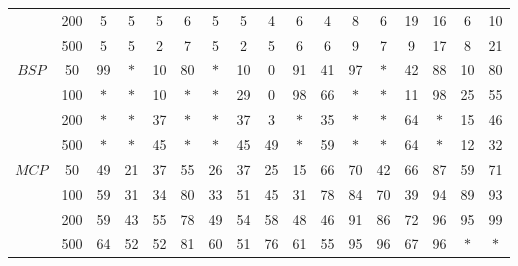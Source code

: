 \documentclass[12pt]{article}
\begin{document}
\begin{table}[p]
\begin{tabular}{c|c|ccc|ccc|ccc|ccc|ccc}
& 200 & 5 & 5 & 5 & 6 & 5 & 5 & 4 & 6 & 4 & 8 & 6 & 19 & 16 & 6  & 10 \\
& 500 & 5 & 5 & 2 & 7 & 5 & 2 & 5 & 6 & 6 & 9 & 7 & 9 & 17 & 8 & 21 \\
\hline
\multirow{ 4}{*}{$BSP$}
& 50  & 99 & $\ast$ & 10 & 80 & $\ast$ & 10 & 0  & 91 & 41 & 97 & $\ast$ & 42 & 88 & 10  &  80\\
& 100 & $\ast$ & $\ast$ & 10 & $\ast$ & $\ast$ & 29 & 0 & 98 & 66 & $\ast$ & $\ast$ & 11 & 98 & 25 & 55 \\
& 200 & $\ast$ & $\ast$ & 37 & $\ast$ & $\ast$ & 37 & 3 & $\ast$ & 35 & $\ast$ & $\ast$ & 64 & $\ast$ & 15  & 46 \\
& 500 & $\ast$ & $\ast$ & 45 & $\ast$ & $\ast$ & 45 & 49 & $\ast$ & 59 & $\ast$ & $\ast$ & 64 & $\ast$ & 12  & 32 \\
\hline
\multirow{ 4}{*}{$MCP$}
& 50  & 49 & 21 & 37 & 55 & 26 & 37 & 25 & 15 & 66 & 70 & 42 & 66 & 87 & 59  &  71\\
& 100 & 59 & 31 & 34 & 80 & 33 & 51 & 45 & 31 & 78 & 84 & 70 & 39 & 94 & 89 & 93 \\
& 200 & 59 & 43 & 55 & 78 & 49 & 54 & 58 & 48 & 46 & 91 & 86 & 72 & 96 & 95  & 99 \\
& 500 & 64 & 52 & 52 & 81 & 60 & 51 & 76 & 61 & 55 & 95 & 96 & 67 & 96 & $\ast$  & $\ast$ \\
\hline
\end{tabular}
\end{table}
\end{document}
